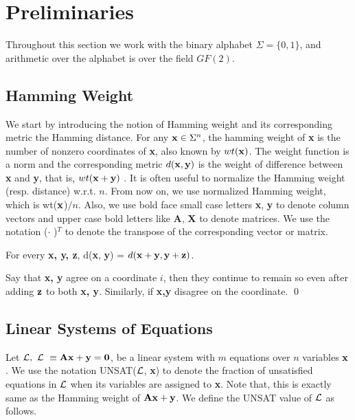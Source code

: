 
\section{Preliminaries}

Throughout this section we work with the binary alphabet $\Sigma =
\{0,1\}$, and arithmetic over the alphabet is over the field $GF(2)$.

\subsection{Hamming Weight}

We start by introducing the notion of Hamming weight and its
corresponding metric the Hamming distance. For any ${\bf x} \in
\Sigma^n$, the hamming weight of {\bf x} is the number of nonzero
coordinates of {\bf x}, also known by $wt({\bf x})$. The weight
function is a norm and the corresponding metric $d({\bf x, y})$ is the
weight of difference between {\bf x} and {\bf y}, that is, $wt({\bf x}
+ {\bf y})$ . It is often useful to normalize the Hamming weight
(resp. distance) w.r.t. $n$. From now on, we use normalized Hamming
weight, which is wt(${\bf x}$)$/n$. Also, we use bold face small case
letters {\bf x}, {\bf y} to denote column vectors and upper case bold
letters like {\bf A}, {\bf X} to denote matrices.  We use the notation
({\bf $\cdot$ })$^T$ to denote the transpose of the corresponding
vector or matrix.

\begin{claim} \label{ind} For every {\bf x, y, z}, d({\bf x}, {\bf y})
  = $d({\bf x} + {\bf y}, {\bf y} + {\bf z})$.
\end{claim}
 Say that {\bf x, y} agree on a coordinate $i$,
then they continue to remain so even after adding ${\bf z}$ to both
{\bf x, y}. Similarly, if {\bf x,y} disagree on the coordinate. \qed

\subsection{Linear Systems of Equations}

Let ${\cal L},\ {\cal L} \ \equiv {\bf Ax} + {\bf y} = {\bf 0}$, be a linear
system with $m$ equations over $n$ variables ${\bf x}$. We use the notation
UNSAT(${\cal L}$, {\bf x}) to denote the fraction of unsatisfied equations
in ${\cal L}$ when its variables are assigned to {\bf x}. Note that, this
is exactly same as the Hamming weight of ${\bf Ax} + {\bf y}$. We
define the UNSAT value of ${\cal L}$ as follows.


